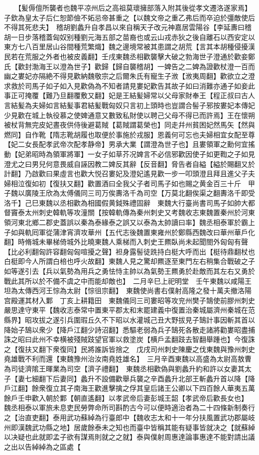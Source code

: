 　　【髪傉儃所襲者也魏平凉州后之高祖莫瓌擁部落入附其後從孝文遷洛遂家焉】子欽為皇太子后仁恕節儉不妬忌帝甚重之【以魏文帝之重乙弗后而卒迫於彊敵使后不得其死悲夫】　稽胡劉蠡升自孝昌以來自稱天子改元神嘉居雲陽谷【李延夀曰稽胡一日步落稽蓋匈奴别種劉元海五部之苗裔也或云山戎赤狄之後自離石以西安定以東方七八百里居山谷間種荒繁熾】魏之邊境常被其患謂之胡荒【言其本胡種侵擾漢民若在荒服之外者也被皮義翻】壬戌東魏丞相歡襲擊大破之勃海世子澄通於歡妾鄭氏【歡封渤海王以澄為世子】歡歸【歸自襲稽胡】一婢告之二婢為證歡杖澄一百而幽之婁妃亦隔絶不得見歡納魏敬宗之后爾朱氏有寵生子浟【浟夷周翻】歡欲立之澄求救於司馬子如子如入見歡偽為不知者請見婁妃歡告其故子如曰消難亦通子如妾此事正可掩覆【難乃旦翻覆敷又翻】妃是王結髪婦常以父母家財奉王【程正叔曰古人言結髪為夫婦如言結髪事君結髪戰匈奴只言初上頭時也豈謂合髻子邪按婁妃本傳妃少見歡在城上執役慕之使婢通意又數致私財使以聘己父母不得已而許焉】王在懷朔被杖背無完皮妃晝夜供侍後避葛賊【葛賊謂葛榮也】同走幷州貧困妃然馬矢【然與燃同】自作靴【隋志靴胡履也取便於事施於戎服】恩義何可忘也夫婦相宜女配至尊【妃二女長配孝武帝次配孝静帝】男承大業【謂澄為世子也】且婁領軍之勳何宜搖動【妃弟昭時為領軍將軍】一女子如草芥况婢言不必信邪歡因使子如更鞫之子如見澄尤之曰男兒何意畏威自誣因教二婢反其辭【反音翻】脅告者自縊【縊於賜翻又於計翻】乃啟歡曰果虛言也歡大悦召婁妃及澄妃遙見歡一步一叩頭澄且拜且進父子夫婦相泣復如初【復扶又翻】歡置酒曰全我父子者司馬子如也賜之黄金百三十斤　甲子魏以廣陵王欣為太傅儀同三司万俟夀洛千為司空【万莫北翻俟渠之翻夀洛千即受洛千】己巳東魏以丞相歡為相國假黄鉞殊禮固辭　東魏大行臺尚書司馬子如帥大都督竇泰太州刺史韓軌等攻潼關【按韓軌傳為秦州刺史又考魏收志東魏置秦州於河東領河東北鄉二郡史蓋誤以秦為泰緣泰之誤又以泰為太帥讀曰率】魏丞相泰軍於霸上子如與軌囘軍從蒲津宵濟攻華州【五代志後魏置東雍州於鄭縣西魏改曰華州華戶化翻】時脩城未畢梯倚城外比曉東魏人乘梯而入刺史王羆臥尚未起聞閤外匈匈有聲【比必利翻匈許容翻匈匈喧擾之聲】袒身露髻徒跣持白梃大呼而出【梃待鼎翻杖也白梃即今人所謂白棓也呼火故翻】東魏人見之驚却羆逐至東門左右稍集合戰破之子如等遂引去【兵以氣勢為用兵之勇怯恃主帥以為氣勢王羆勇於赴敵而其左右又勇於戰此其所以於不備不虞之中而能却敵也】　二月辛巳上祀明堂　壬午東魏以咸陽王坦為太傳西河王悰為太尉【悰徂宗翻】　東魏使尚書右僕射高隆之發十萬夫撤洛陽宫殿運其材入鄴　丁亥上耕籍田　東魏儀同三司婁昭等攻兖州樊子鵠使前膠州刺史嚴思達守東平【魏收志泰常中置東平郡太和末罷建義中復置治秦城屬濟州秦城在范縣界】昭攻拔之遂引兵圍瑕丘久不下昭以水灌城己丑大野拔見子鵠計事因斬其首以降始子鵠以衆少【降戶江翻少詩沼翻】悉驅老弱為兵子鵠死各散走諸將勸婁昭盡捕誅之昭曰此州不幸横被殘賊跂望官軍以救塗炭【横戶孟翻跂去智翻舉踵也】今復誅之【復扶又翻下衆復同】民將誰訴皆捨之　戊戌司州刺史陳慶之伐東魏與豫州刺史堯雄戰不利而還【東魏豫州治汝南堯姓雄名】　三月辛酉東魏以高盛為太尉高敖曹為司徒濟隂王暉業為司空【濟子禮翻】　東魏丞相歡偽與劉蠡升約和許以女妻其太子【妻七細翻下后妻同】蠡升不設備歡舉兵襲之辛酉蠡升北部王斬蠡升首以降【降戶江翻】餘衆復立其子南海王歡進擊擒之俘其皇后諸王公卿以下四百餘人華夷五萬餘戶壬申歡入朝於鄴【朝直遙翻】以孝武帝后妻彭城王韶【孝武帝后歡長女也】　魏丞相泰以軍旅未息吏民勞弊命所司斟酌古今可以便時適治者為二十四條新制奏行之【治直吏翻】泰用武功蘇綽為行臺郎中【魏收志太和十一年分扶風置武功郡屬岐州即漢魏武功縣之地】居歲餘泰未之知也而臺中皆稱其能有疑事皆就决之【就蘇綽以决疑也此就即孟子欲有謀焉則就之之就】泰與僕射周惠達論事惠達不能對請出議之出以告綽綽為之區處【